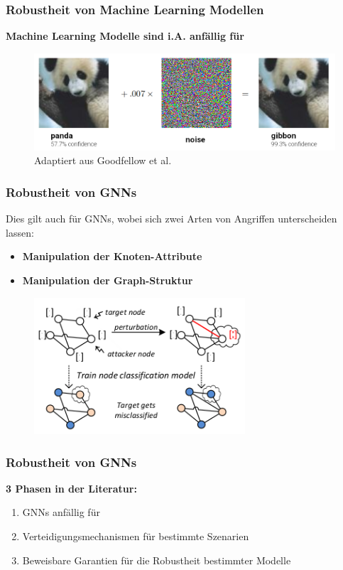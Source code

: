 \documentclass{beamer}
\begin{document}
\begin{frame}
  \frametitle{Robustheit von Machine Learning Modellen}

  \textbf{Machine Learning Modelle sind i.A. anfällig für }

  \begin{figure}
    \centering
    \includegraphics[width=\textwidth]{img/adversarial.png}
    \caption*{Adaptiert aus Goodfellow et al. \cite{Goodfellow_2015}}
  \end{figure}
\end{frame}

\begin{frame}
  \frametitle{Robustheit von GNNs}
  Dies gilt auch für GNNs, wobei sich zwei Arten von Angriffen unterscheiden lassen:
  \begin{itemize}
    \item \textbf{Manipulation der Knoten-Attribute}
    \item \textbf{Manipulation der Graph-Struktur}
  \end{itemize}
  \begin{figure}
    \centering
    \includegraphics[width=0.7\textwidth]{img/adversarial_GNN.png}
    \caption*{ \cite{Zuegner_2018}}
  \end{figure}
\end{frame}

\begin{frame}
  \frametitle{Robustheit von GNNs}
  \textbf{3 Phasen in der Literatur:}
  \begin{enumerate}
    \item GNNs anfällig für 
    \item Verteidigungsmechanismen für bestimmte Szenarien
    \item Beweisbare Garantien für die Robustheit bestimmter Modelle
  \end{enumerate}
\end{frame}
\end{document}
